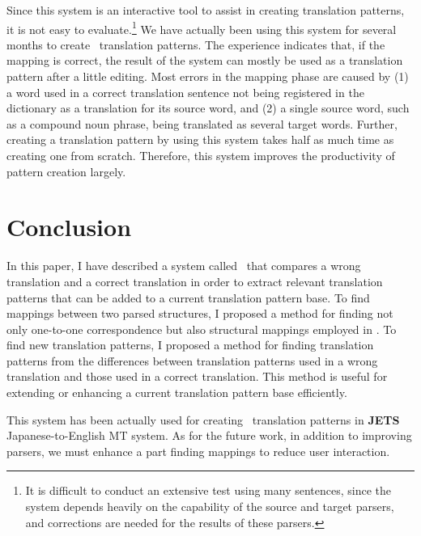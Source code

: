 Since this system is an interactive tool to assist in creating translation
patterns, it is not easy to evaluate.\footnote{ It is difficult to conduct an
extensive test using many sentences, since the system depends heavily on the
capability of the source and target parsers, and corrections are needed for
the results of these parsers.} We have actually been using this system for
several months to create \SimTran\ translation patterns. The experience
indicates that, if the mapping is correct, the result of the system can mostly
be used as a translation pattern after a little editing.  Most errors in the
mapping phase are caused by (1) a word used in a correct translation sentence
not being registered in the dictionary as a translation for its source word,
and (2) a single source word, such as a compound noun phrase, being translated
as several target words.  Further, creating a translation pattern by using
this system takes half as much time as creating one from scratch.
Therefore, this system improves the productivity of pattern creation largely.

\section{Conclusion}
\label{sec:conclusion}

In this paper, I have described a system called \TranPet\ that compares a
wrong translation and a correct translation in order to extract relevant
translation patterns that can be added to a current translation pattern base. 
To find mappings between two parsed structures, I proposed a method for
finding not only one-to-one correspondence but also structural mappings
employed in \SimTran. To find new translation patterns, I proposed a method
for finding translation patterns from the differences between translation
patterns used in a wrong translation and those used in a correct translation. 
This method is useful for extending or enhancing a current translation pattern
base efficiently.

This system has been actually used for creating \SimTran\ translation patterns
in {\bf JETS} Japanese-to-English MT system. As for the future work,
in addition to improving parsers, we must enhance a part finding mappings
to reduce user interaction.





\begin{biography}
  \biotitle{}

\end{biography}




